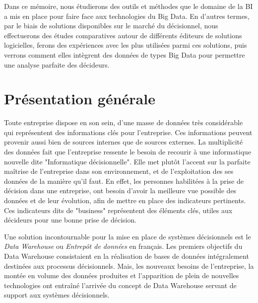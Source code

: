 \documentclass[12pt,a4wide,twoside]{report}
\begin{document}
Dans ce mémoire, nous étudierons des outils et méthodes que le domaine de la BI a mis en place pour faire face aux technologies du Big Data. En d'autres termes, par le biais de solutions disponibles sur le marché du décisionnel, nous effectuerons des études comparatives autour de différents éditeurs de solutions logicielles, ferons des expériences avec les plus utilisées parmi ces solutions, puis verrons comment elles intègrent des données de types Big Data pour permettre une analyse parfaite des décideurs.
 


\chapter{Présentation générale} %
	Toute entreprise dispose en son sein, d'une masse de données très considérable qui représentent des informations clés pour l'entreprise. Ces informations peuvent provenir aussi bien de sources internes que de sources externes. La multiplicité des données fait que l'entreprise ressente le besoin de recourir à une informatique nouvelle dite "Informatique décisionnelle". Elle met plutôt l'accent sur la parfaite maîtrise de l'entreprise dans son environnement, et de l'exploitation des ses données de la manière qu'il faut.\newline
	En effet, les personnes habilitées à la prise de décision dans une entreprise, ont besoin d'avoir la meilleure vue possible des données et de leur évolution, afin de mettre en place des indicateurs pertinents. Ces indicateurs dits de "business" représentent des éléments clés, utiles aux décideurs pour une bonne prise de décision.

	Une solution incontournable pour la mise en place de systèmes décisionnels est le \emph{Data Warehouse} ou \emph{Entrepôt de données} en français.\newline
	Les premiers objectifs du Data Warehouse consistaient en la réalisation de bases de données intégralement destinées aux processus décisionnels.\newline
	Mais, les nouveaux besoins de l'entreprise, la montée en volume des données produites et l'apparition de plein de nouvelles technologies ont entraîné l'arrivée du concept de Data Warehouse servant de support aux systèmes décisionnels. 	
	
\end{document}
